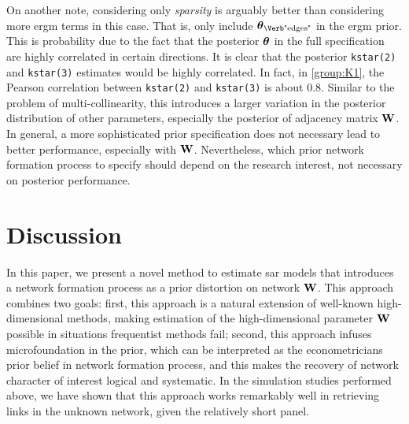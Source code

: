 \documentclass[a4paper]{article}
\begin{document}
On another note,
considering only \emph{sparsity} is arguably better than considering more \gls{ergm} terms in this case.
That is, only include $\ttheta_{\text{\Verb"edges"}}$ in the \gls{ergm} prior.
This is probability due to the fact that the posterior $\boldsymbol{\theta}$ in the full specification are highly correlated in certain directions.
It is clear that the posterior \Verb"kstar(2)" and \Verb"kstar(3)" estimates would be highly correlated.
In fact, in \ref{group:K1}, the Pearson correlation between \Verb"kstar(2)" and \Verb"kstar(3)" is about $0.8$.
Similar to the problem of multi-collinearity, this introduces a larger variation in the posterior distribution of other parameters,
especially the posterior of adjacency matrix $\mathbf{W}$.
In general, a more sophisticated prior specification does not necessary lead to better performance,
especially with $\mathbf{W}$.
Nevertheless, which prior network formation process to specify should depend on the research interest,
not necessary on posterior performance.


\section{Discussion}\label{sec:discussion}

In this paper,
we present a novel method to estimate \gls{sar} models
that introduces a network formation process as a prior distortion on network $\mathbf{W}$.
This approach combines two goals:
first, this approach is a natural extension of well-known high-dimensional methods,
making estimation of the high-dimensional parameter $\mathbf{W}$ possible in situations frequentist methods fail;
second, this approach infuses microfoundation in the prior,
which can be interpreted as the econometricians prior belief in network formation process,
and this makes the recovery of network character of interest logical and systematic.
In the simulation studies performed above,
we have shown that this approach works remarkably well in retrieving links in the unknown network,
given the relatively short panel.
\end{document}
